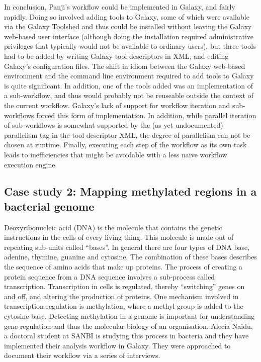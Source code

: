 \documentclass[a4paper,10pt]{scrreprt} \usepackage[utf8]{inputenc}
\begin{document}
In conclusion, Panji's workflow could be implemented in Galaxy, and fairly rapidly. Doing so involved adding tools to Galaxy, some of which were available via the Galaxy Toolshed and thus could be installed without leaving the Galaxy web-based user interface (although doing the installation required administrative privileges that typically would not be available to ordinary users), but three tools had to be added by writing Galaxy tool descriptors in XML, and editing Galaxy's configuration files. The shift in idiom between the Galaxy web-based environment and the command line environment required to add tools to Galaxy is quite significant. In addition, one of the tools added was an implementation of a sub-workflow, and thus would probably not be reuseable outside the context of the current workflow. Galaxy's lack of support for workflow iteration and sub-workflows forced this form of implementation. In addition, while parallel iteration of sub-workflows is somewhat supported by the (as yet undocumented) 
parallelism tag in the tool descriptor XML, the degree of parallelism can not be chosen at runtime. Finally, executing each step of the workflow as its own task leads to inefficiencies that might be avoidable with a less naive workflow execution engine.





  
\subsection{Case study 2: Mapping methylated regions in a bacterial genome}

Deoxyribonucleic acid (DNA) is the molecule that contains the genetic instructions in the cells of every living thing. This molecule is made out of repeating sub-units called ``bases''. In general there are four types of DNA base, adenine, thymine, guanine and cytosine. The combination of these bases describes the sequence of amino acids that make up proteins. The process of creating a protein sequence from a DNA sequence involves a sub-process called transcription. Transcription in cells is regulated, thereby ``switching'' genes on and off, and altering the production of proteins. One mechanism involved in transcription regulation is methylation, where a methyl group is added to the cytosine base. Detecting methylation in a genome is important for understanding gene regulation and thus the molecular biology of an organisation. Alecia Naidu, a doctoral student at SANBI is studying this process in bacteria and they have implemented their analysis workflow in Galaxy. They were approached to document their 
workflow via a series of interviews.
\end{document}
